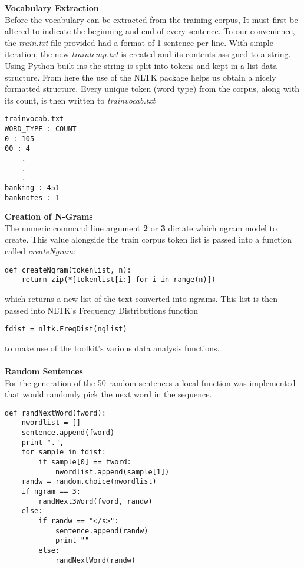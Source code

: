 \documentclass{article}
\begin{document}
\textbf{Vocabulary Extraction}\\
Before the vocabulary can be extracted from the training corpus, It must first be altered to indicate the beginning and end of every sentence. To our convenience, the \textit{train.txt} file provided had a format of 1 sentence per line. With simple iteration, the new \textit{traintemp.txt} is created and its contents assigned to a string.\\
Using Python built-ins the string is split into tokens and kept in a list data structure. From here the use of the NLTK package helps us obtain a nicely formatted structure. Every unique token (word type) from the corpus, along with its count, is then written to \textit{trainvocab.txt} 
\begin{verbatim}
trainvocab.txt
WORD_TYPE : COUNT
0 : 105
00 : 4
    .
    .
    .
banking : 451
banknotes : 1
\end{verbatim}
\textbf{Creation of N-Grams}\\
The numeric command line argument \textbf{2} or \textbf{3} dictate which ngram model to create. This value alongside the train corpus token list is passed into a function called \textit{createNgram}:
\begin{verbatim}
def createNgram(tokenlist, n):
    return zip(*[tokenlist[i:] for i in range(n)])
\end{verbatim}
which returns a new list of the text converted into ngrams. This list is then passed into NLTK's Frequency Distributions function 
\begin{verbatim}fdist = nltk.FreqDist(nglist)
\end{verbatim}
to make use of the toolkit's various data analysis functions.\\
\\
\textbf{Random Sentences}\\
For the generation of the 50 random sentences a local function was implemented that would randomly pick the next word in the sequence.
\begin{verbatim}
def randNextWord(fword):
    nwordlist = []
    sentence.append(fword)
    print ".",
    for sample in fdist:
        if sample[0] == fword:
            nwordlist.append(sample[1])
    randw = random.choice(nwordlist)
    if ngram == 3:
        randNext3Word(fword, randw)
    else:
        if randw == "</s>":
            sentence.append(randw)
            print ""
        else:
            randNextWord(randw)
            
            
\end{verbatim}
\end{document}
